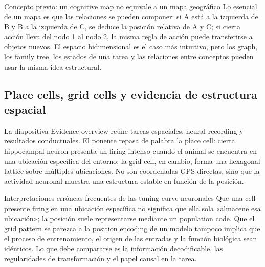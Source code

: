 \begin{knowledgebox}{Concepto previo: un cognitive map no equivale a un mapa geográfico}
Lo esencial de un mapa es que las relaciones se pueden componer: si A está a la izquierda de B y B a la izquierda de C, se deduce la posición relativa de A y C; si cierta acción lleva del nodo 1 al nodo 2, la misma regla de acción puede transferirse a objetos nuevos. El espacio bidimensional es el caso más intuitivo, pero los graph, los family tree, los estados de una tarea y las relaciones entre conceptos pueden usar la misma idea estructural.
\end{knowledgebox}

\subsection{Place cells, grid cells y evidencia de estructura espacial}

La diapositiva Evidence overview reúne tareas espaciales, neural recording y resultados conductuales. El ponente repasa de palabra la place cell: cierta hippocampal neuron presenta un firing intenso cuando el animal se encuentra en una ubicación específica del entorno; la grid cell, en cambio, forma una hexagonal lattice sobre múltiples ubicaciones. No son coordenadas GPS directas, sino que la actividad neuronal muestra una estructura estable en función de la posición.



\begin{warningbox}{Interpretaciones erróneas frecuentes de las tuning curve neuronales}
Que una cell presente firing en una ubicación específica no significa que ella sola «almacene esa ubicación»; la posición suele representarse mediante un population code. Que el grid pattern se parezca a la position encoding de un modelo tampoco implica que el proceso de entrenamiento, el origen de las entradas y la función biológica sean idénticos. Lo que debe compararse es la información decodificable, las regularidades de transformación y el papel causal en la tarea.
\end{warningbox}

